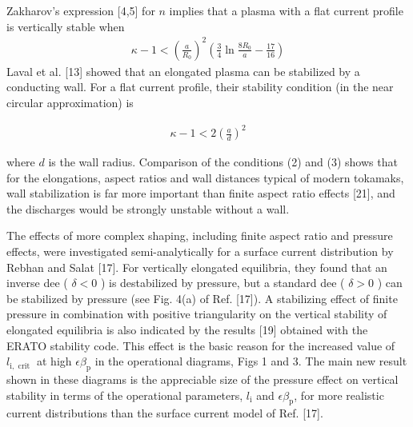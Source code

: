\documentclass[utf8]{ctexart}
\begin{document}
\begin{sloppypar}
  
 
 Zakharov's expression [4,5] for $n$ implies that a plasma with a flat current profile is vertically stable when
\begin{align*}
	 \kappa-1<\left(\frac{a}{R_{0}}\right)^{2}\left(\frac{3}{4} \ln \frac{8 R_{0}}{a}-\frac{17}{16}\right) \tag{2}
\end{align*}
 Laval et al. [13] showed that an elongated plasma can be stabilized by a conducting wall. For a flat current profile, their stability condition (in the near circular approximation) is
 
\begin{align*}
	 \kappa-1<2\left(\frac{a}{d}\right)^{2} \tag{3}
\end{align*}
 
 where $d$ is the wall radius. Comparison of the conditions (2) and (3) shows that for the elongations, aspect ratios and wall distances typical of modern tokamaks, wall stabilization is far more important than finite aspect ratio effects [21], and the discharges would be strongly unstable without a wall.
 
 
 The effects of more complex shaping, including finite aspect ratio and pressure effects, were investigated semi-analytically for a surface current distribution by Rebhan and Salat [17]. For vertically elongated equilibria, they found that an inverse dee ( $\delta<0$ ) is destabilized by pressure, but a standard dee ( $\delta>0$ ) can be stabilized by pressure (see Fig. 4(a) of Ref. [17]). A stabilizing effect of finite pressure in combination with positive triangularity on the vertical stability of elongated equilibria is also indicated by the results [19] obtained with the ERATO stability code. This effect is the basic reason for the increased value of $l_{\mathrm{i}, \text { crit }}$ at high $\epsilon \beta_{\mathrm{p}}$ in the operational diagrams, Figs 1 and 3. The main new result shown in these diagrams is the appreciable size of the pressure effect on vertical stability in terms of the operational parameters, $l_{\mathrm{i}}$ and $\epsilon \beta_{\mathrm{p}}$, for more realistic current distributions than the surface current model of Ref. [17].
 

\end{sloppypar}
\end{document}
